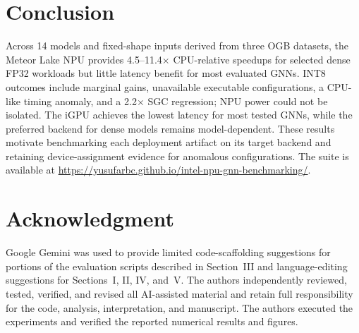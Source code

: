 \documentclass[conference]{IEEEtran}
\begin{document}
\section{Conclusion}
Across 14 models and fixed-shape inputs derived from three OGB datasets, the Meteor Lake NPU provides 4.5--11.4$\times$ CPU-relative speedups for selected dense FP32 workloads but little latency benefit for most evaluated GNNs. INT8 outcomes include marginal gains, unavailable executable configurations, a CPU-like timing anomaly, and a 2.2$\times$ SGC regression; NPU power could not be isolated. The iGPU achieves the lowest latency for most tested GNNs, while the preferred backend for dense models remains model-dependent. These results motivate benchmarking each deployment artifact on its target backend and retaining device-assignment evidence for anomalous configurations. The suite is available at \url{https://yusufarbc.github.io/intel-npu-gnn-benchmarking/}.

\section*{Acknowledgment}

Google Gemini was used to provide limited code-scaffolding suggestions for portions of the evaluation scripts described in Section~III and language-editing suggestions for Sections~I, II, IV, and~V. The authors independently reviewed, tested, verified, and revised all AI-assisted material and retain full responsibility for the code, analysis, interpretation, and manuscript. The authors executed the experiments and verified the reported numerical results and figures.



\end{document}
